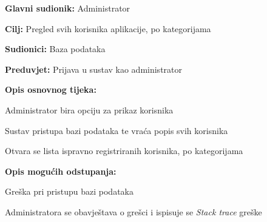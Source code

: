 					\noindent {}
					\begin{packed_item}
						
						\item \textbf{Glavni sudionik: }Administrator
						\item  \textbf{Cilj:} Pregled svih korisnika aplikacije, po kategorijama
						\item  \textbf{Sudionici:} Baza podataka
						\item  \textbf{Preduvjet:} Prijava u sustav kao administrator
						\item  \textbf{Opis osnovnog tijeka:}
						
						\item[] \begin{packed_enum}
							
							\item Administrator bira opciju za prikaz korisnika
							\item Sustav pristupa bazi podataka te vraća popis svih korisnika
							\item Otvara se lista ispravno registriranih korisnika, po kategorijama
						\end{packed_enum}
						\item \textbf{Opis mogućih odstupanja:}
						\item[] \begin{packed_item}
							
							\item[2.a] Greška pri pristupu bazi podataka
							\item[] \begin{packed_enum}
								
								\item Administratora se obavještava o grešci i ispisuje se \textit{Stack trace} greške
								
							\end{packed_enum}
						\end{packed_item}
					\end{packed_item}
					
